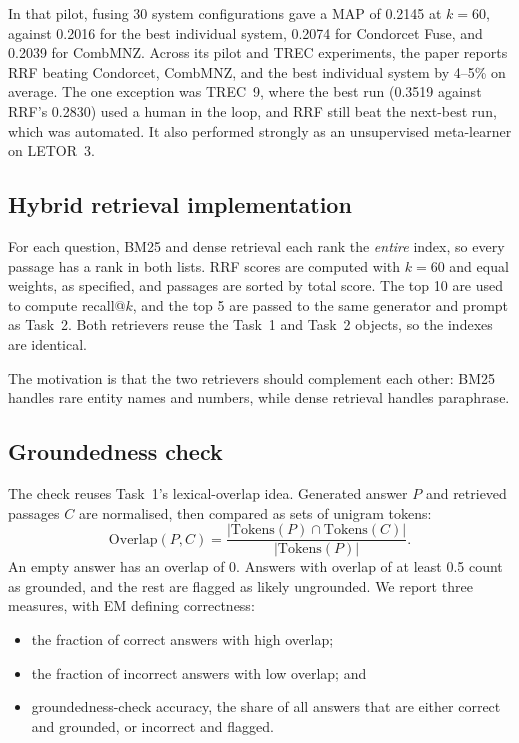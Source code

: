 \documentclass[11pt,a4paper]{article}
\begin{document}
In that pilot, fusing 30 system configurations gave a MAP of 0.2145 at $k=60$, against 0.2016 for the best individual system, 0.2074 for Condorcet Fuse, and 0.2039 for CombMNZ. Across its pilot and TREC experiments, the paper reports RRF beating Condorcet, CombMNZ, and the best individual system by 4--5\% on average. The one exception was TREC~9, where the best run (0.3519 against RRF's 0.2830) used a human in the loop, and RRF still beat the next-best run, which was automated. It also performed strongly as an unsupervised meta-learner on LETOR~3.

\subsection{Hybrid retrieval implementation}
For each question, BM25 and dense retrieval each rank the \emph{entire} index, so every passage has a rank in both lists. RRF scores are computed with $k=60$ and equal weights, as specified, and passages are sorted by total score. The top 10 are used to compute recall@$k$, and the top 5 are passed to the same generator and prompt as Task~2. Both retrievers reuse the Task~1 and Task~2 objects, so the indexes are identical.

The motivation is that the two retrievers should complement each other: BM25 handles rare entity names and numbers, while dense retrieval handles paraphrase.

\subsection{Groundedness check}
\label{sec:groundedness}
The check reuses Task~1's lexical-overlap idea. Generated answer $P$ and retrieved passages $C$ are normalised, then compared as sets of unigram tokens:
\begin{equation}
    \text{Overlap}(P, C) = \frac{|\text{Tokens}(P) \cap \text{Tokens}(C)|}{|\text{Tokens}(P)|}.
\end{equation}
An empty answer has an overlap of 0. Answers with overlap of at least 0.5 count as grounded, and the rest are flagged as likely ungrounded. We report three measures, with EM defining correctness:
\begin{itemize}
    \item the fraction of correct answers with high overlap;
    \item the fraction of incorrect answers with low overlap; and
    \item groundedness-check accuracy, the share of all answers that are either correct and grounded, or incorrect and flagged.
\end{itemize}
\end{document}
